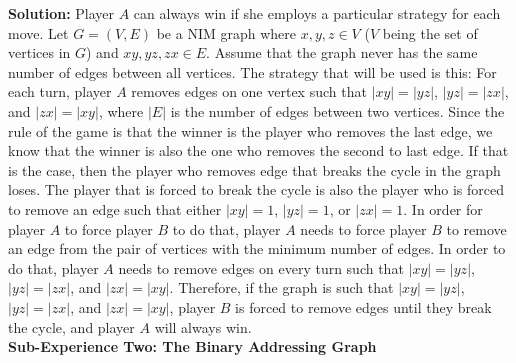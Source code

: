 \documentclass[10pt,a4paper]{report}
\begin{document}
	\textbf{Solution: }Player $A$ can always win if she employs a particular strategy for each move.  Let $G = (V, E)$ be a NIM graph where $x, y, z \in V$ ($V$ being the set of vertices in $G$) and $xy, yz, zx \in E$.  Assume that the graph never has the same number of edges between all vertices. The strategy that will be used is this: For each turn, player $A$ removes edges on one vertex such that $|xy| = |yz|$, $|yz| = |zx|$, and $|zx| = |xy|$, where $|E|$ is the number of edges between two vertices. Since the rule of the game is that the winner is the player who removes the last edge, we know that the winner is also the one who removes the second to last edge.  If that is the case, then the player who removes edge that breaks the cycle in the graph loses. The player that is forced to break the cycle is also the player who is forced to remove an edge such that either $|xy| = 1$, $|yz| = 1$, or $|zx| = 1$.  In order for player $A$ to force player $B$ to do that, player $A$ needs to force player $B$ to remove an edge from the pair of vertices with the minimum number of edges.  In order to do that, player $A$ needs to remove edges on every turn such that $|xy| = |yz|$, $|yz| = |zx|$, and $|zx| = |xy|$. Therefore, if the graph is such that $|xy| = |yz|$, $|yz| = |zx|$, and $|zx| = |xy|$, player $B$ is forced to remove edges until they break the cycle, and player $A$ will always win.\\
	\newline
	\textbf{Sub-Experience Two: The Binary Addressing Graph}
\end{document}
